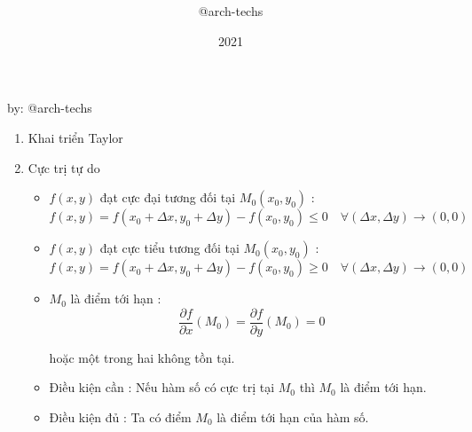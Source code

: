\documentclass[12pt,a4paper]{report}
\title{\framebox {
        \textcolor{TEcolor}{
            \Huge {    CALCULUS II    }
        }
    }    }
\author{\Large @arch-techs}
\date{2021}
\begin{document}
{\selectfont
\begin{titlepage}
\maketitle
\end{titlepage}
\newpage

\begin{center}
    \begin{center}
    \end{center}
    
    \vspace{5mm}
    
    by: @arch-techs
    
    \vspace{1cm}
    
    \begin{enumerate}
        \item Khai triển Taylor
       
            
   		\item Cực trị tự do
            \begin{itemize}
                \item $f(x, y)$ đạt cực đại tương đối tại $M_{0}(x_{0}, y_{0})$ :  
                    \[f(x, y) = f(x_{0} + \Delta x, y_{0} + \Delta y) - f(x_{0}, y_{0}) \leqslant 0 \quad \forall (\Delta x, \Delta y) \to (0, 0)
                    \] 
                \item  $f(x, y)$ đạt cực tiểu tương đối tại $M_{0}(x_{0}, y_{0})$ :  
                \[f(x, y) = f(x_{0} + \Delta x, y_{0} + \Delta y) - f(x_{0}, y_{0}) \geqslant  0 \quad \forall (\Delta x, \Delta y) \to (0, 0)
                \] 
                \item $M_{0}$ là điểm tới hạn :
                    \[\dfrac{\partial f}{\partial x}(M_{0}) = \dfrac{\partial f}{\partial y}(M_{0}) = 0\]

                    hoặc một trong hai không tồn tại.
                \item Điều kiện cần :
                    Nếu hàm số có cực trị tại $M_{0}$ thì $M_{0}$ là điểm tới hạn.
                \item Điều kiện đủ :
                    Ta có điểm $M_{0}$ là điểm tới hạn của hàm số.


\end{itemize}
\end{enumerate}
\end{center}}
\end{document}
